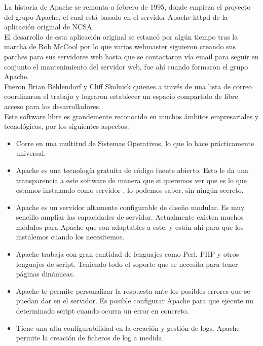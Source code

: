 La historia de Apache se remonta a febrero de 1995, donde empieza el proyecto del grupo Apache, el cual est\'a basado en el servidor Apache httpd de la aplicaci\'on original de NCSA.\\

El desarrollo de esta aplicaci\'on original se estanc\'o por alg\'un tiempo tras la marcha de Rob McCool por lo que varios webmaster siguieron creando sus parches para sus servidores web hasta que se contactaron v\'ia email para seguir en conjunto el mantenimiento del servidor web, fue ah\'i cuando formaron el grupo Apache. \cite{apache_server}\\

Fueron Brian Behlendorf y Cliff Skolnick quienes a trav\'es de una lista de correo coordinaron el trabajo y lograron establecer un espacio compartido de libre acceso para los desarrolladores.\\

Este software libre es grandemente reconocido en muchos \'ambitos empresariales y tecnol\'ogicos, por los siguientes aspectos: 
\begin{itemize}
\item Corre en una multitud de Sistemas Operativos, lo que lo hace pr\'acticamente universal.
\item Apache es una tecnolog\'ia gratuita de c\'odigo fuente abierto. Esto le da una transparencia a este software de manera que si queremos ver que es lo que estamos instalando como servidor , lo podemos saber, sin ning\'un secreto.
\item Apache es un servidor altamente configurable de dise\~no modular. Es muy sencillo ampliar las capacidades de servidor. Actualmente existen muchos m\'odulos para Apache que son adaptables a este, y est\'an ah\'i para que los instalemos cuando los necesitemos. 
\item Apache trabaja con gran cantidad de lenguajes como Perl, PHP y otros lenguajes de script. Teniendo todo el soporte que se necesita para tener p\'aginas din\'amicas.
\item Apache te permite personalizar la respuesta ante los posibles errores que se puedan dar en el servidor. Es posible configurar Apache para que ejecute un determinado script cuando ocurra un error en concreto.
\item Tiene una alta configurabilidad en la creaci\'on y gesti\'on de logs. Apache permite la creaci\'on de ficheros de log a medida.
\end{itemize}

